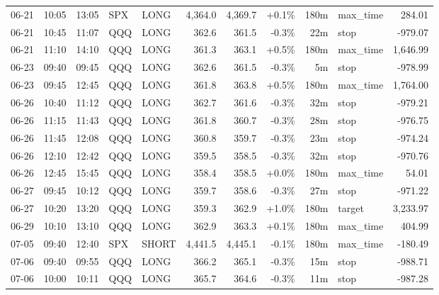 \documentclass[11pt,a4paper,twoside]{article}
\begin{document}
\begin{center}
\begin{longtable}{>{\color{txtmain}}l l l l l r r r r >{\color{txtmain}}l r}
06-21 & 10:05 & 13:05 & SPX & LONG & 4,364.0 & 4,369.7 & \textcolor{wingreen}{+0.1\%} & 180m & max\_time & \textcolor{wingreen}{284.01} \\
06-21 & 10:45 & 11:07 & QQQ & LONG & 362.6 & 361.5 & \textcolor{lossred}{-0.3\%} & 22m & stop & \textcolor{lossred}{-979.07} \\
06-21 & 11:10 & 14:10 & QQQ & LONG & 361.3 & 363.1 & \textcolor{wingreen}{+0.5\%} & 180m & max\_time & \textcolor{wingreen}{1,646.99} \\
06-23 & 09:40 & 09:45 & QQQ & LONG & 362.6 & 361.5 & \textcolor{lossred}{-0.3\%} & 5m & stop & \textcolor{lossred}{-978.99} \\
06-23 & 09:45 & 12:45 & QQQ & LONG & 361.8 & 363.8 & \textcolor{wingreen}{+0.5\%} & 180m & max\_time & \textcolor{wingreen}{1,764.00} \\
06-26 & 10:40 & 11:12 & QQQ & LONG & 362.7 & 361.6 & \textcolor{lossred}{-0.3\%} & 32m & stop & \textcolor{lossred}{-979.21} \\
06-26 & 11:15 & 11:43 & QQQ & LONG & 361.8 & 360.7 & \textcolor{lossred}{-0.3\%} & 28m & stop & \textcolor{lossred}{-976.75} \\
06-26 & 11:45 & 12:08 & QQQ & LONG & 360.8 & 359.7 & \textcolor{lossred}{-0.3\%} & 23m & stop & \textcolor{lossred}{-974.24} \\
06-26 & 12:10 & 12:42 & QQQ & LONG & 359.5 & 358.5 & \textcolor{lossred}{-0.3\%} & 32m & stop & \textcolor{lossred}{-970.76} \\
06-26 & 12:45 & 15:45 & QQQ & LONG & 358.4 & 358.5 & \textcolor{wingreen}{+0.0\%} & 180m & max\_time & \textcolor{wingreen}{54.01} \\
06-27 & 09:45 & 10:12 & QQQ & LONG & 359.7 & 358.6 & \textcolor{lossred}{-0.3\%} & 27m & stop & \textcolor{lossred}{-971.22} \\
06-27 & 10:20 & 13:20 & QQQ & LONG & 359.3 & 362.9 & \textcolor{wingreen}{+1.0\%} & 180m & target & \textcolor{wingreen}{3,233.97} \\
06-29 & 10:10 & 13:10 & QQQ & LONG & 362.9 & 363.3 & \textcolor{wingreen}{+0.1\%} & 180m & max\_time & \textcolor{wingreen}{404.99} \\
07-05 & 09:40 & 12:40 & SPX & SHORT & 4,441.5 & 4,445.1 & \textcolor{lossred}{-0.1\%} & 180m & max\_time & \textcolor{lossred}{-180.49} \\
07-06 & 09:40 & 09:55 & QQQ & LONG & 366.2 & 365.1 & \textcolor{lossred}{-0.3\%} & 15m & stop & \textcolor{lossred}{-988.71} \\
07-06 & 10:00 & 10:11 & QQQ & LONG & 365.7 & 364.6 & \textcolor{lossred}{-0.3\%} & 11m & stop & \textcolor{lossred}{-987.28} \\

\end{longtable}
\end{center}
\end{document}
